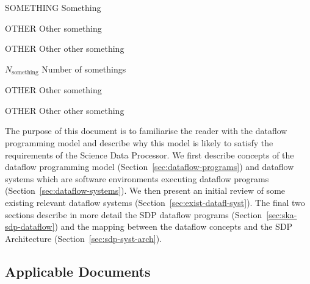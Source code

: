 \documentclass[11pt,a4paper]{article}
\begin{document}
\sdpfrontpage

\sdptableofcontents

\sdplistofabbreviations
\begin{basedescript}{\desclabelstyle{\pushlabel}\desclabelwidth{6em}}
    \item[SOMETHING] Something \vspace{-0.2cm}
    \item[OTHER] Other something \vspace{-0.2cm}
    \item[OTHER] Other other something \vspace{-0.2cm}
\end{basedescript} 

\sdplistofsymbols
\begin{basedescript}{\desclabelstyle{\pushlabel}\desclabelwidth{6em}}
    \item[$N_\mathrm{something}$] Number of somethings \vspace{-0.2cm}
    \item[OTHER] Other something \vspace{-0.2cm}
    \item[OTHER] Other other something \vspace{-0.2cm}
\end{basedescript} 


\sdplistoffigures

\sdplistoftables

\sdpsummary

The purpose of this document is to familiarise the reader with the
dataflow programming model and describe why this model is likely to
satisfy the requirements of the Science Data Processor.  We first
describe concepts of the dataflow programming model
(Section~\ref{sec:dataflow-programs}) and dataflow systems which are
software environments executing dataflow programs
(Section~\ref{sec:dataflow-systems}). We then present an initial
review of some existing relevant dataflow systems
(Section~\ref{sec:exist-datafl-syst}). The final two sections describe
in more detail the SDP dataflow programs
(Section~\ref{sec:ska-sdp-dataflow}) and the mapping between the
dataflow concepts and the SDP Architecture
(Section~\ref{sec:sdp-syst-arch}).

\sdpreferencedocs

\subsection*{Applicable Documents}
\end{document}
